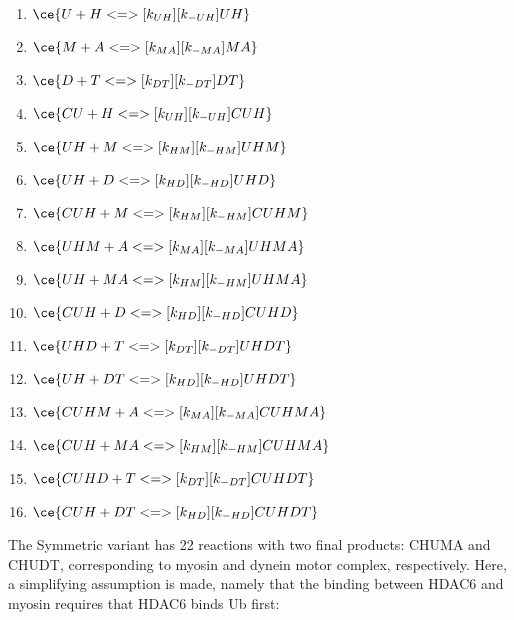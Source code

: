 \begin{enumerate}
\item $\ce{U + H <=>[k_{UH}][k_{-UH}] UH}$ %
\item $\ce{M + A <=>[k_{MA}][k_{-MA}] MA}$ %
\item $\ce{D + T <=>[k_{DT}][k_{-DT}] DT}$ %

\item $\ce{CU + H <=>[k_{UH}][k_{-UH}] CUH}$ %
\item $\ce{UH + M <=>[k_{HM}][k_{-HM}] UHM}$ %
\item $\ce{UH + D <=>[k_{HD}][k_{-HD}] UHD}$ %

\item $\ce{CUH + M <=>[k_{HM}][k_{-HM}] CUHM}$ %
\item $\ce{UHM + A <=>[k_{MA}][k_{-MA}] UHMA}$ %
\item $\ce{UH + MA <=>[k_{HM}][k_{-HM}] UHMA}$ %
\item $\ce{CUH + D <=>[k_{HD}][k_{-HD}] CUHD}$ %
\item $\ce{UHD + T <=>[k_{DT}][k_{-DT}] UHDT}$ %
\item $\ce{UH + DT <=>[k_{HD}][k_{-HD}] UHDT}$ %

\item $\ce{CUHM + A <=>[k_{MA}][k_{-MA}] CUHMA}$ %
\item $\ce{CUH + MA <=>[k_{HM}][k_{-HM}] CUHMA}$ %
\item $\ce{CUHD + T <=>[k_{DT}][k_{-DT}] CUHDT}$ %
\item $\ce{CUH + DT <=>[k_{HD}][k_{-HD}] CUHDT}$ %
\end{enumerate}

The Symmetric variant has 22 reactions with two final products: CHUMA and CHUDT, corresponding to myosin and dynein motor complex, respectively. Here, a simplifying assumption is made, namely that the binding between HDAC6 and myosin requires that HDAC6 binds Ub first:

